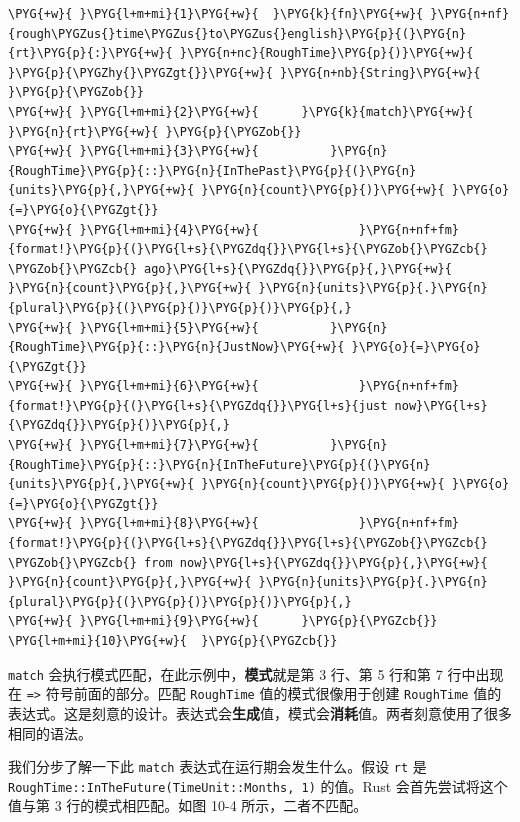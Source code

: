 \begin{Verbatim}[commandchars=\\\{\},breaklines=true,breakanywhere=true,fontsize=\codefont,xleftmargin=17bp]
\PYG{+w}{ }\PYG{l+m+mi}{1}\PYG{+w}{  }\PYG{k}{fn}\PYG{+w}{ }\PYG{n+nf}{rough\PYGZus{}time\PYGZus{}to\PYGZus{}english}\PYG{p}{(}\PYG{n}{rt}\PYG{p}{:}\PYG{+w}{ }\PYG{n+nc}{RoughTime}\PYG{p}{)}\PYG{+w}{ }\PYG{p}{\PYGZhy{}\PYGZgt{}}\PYG{+w}{ }\PYG{n+nb}{String}\PYG{+w}{ }\PYG{p}{\PYGZob{}}
\PYG{+w}{ }\PYG{l+m+mi}{2}\PYG{+w}{      }\PYG{k}{match}\PYG{+w}{ }\PYG{n}{rt}\PYG{+w}{ }\PYG{p}{\PYGZob{}}
\PYG{+w}{ }\PYG{l+m+mi}{3}\PYG{+w}{          }\PYG{n}{RoughTime}\PYG{p}{::}\PYG{n}{InThePast}\PYG{p}{(}\PYG{n}{units}\PYG{p}{,}\PYG{+w}{ }\PYG{n}{count}\PYG{p}{)}\PYG{+w}{ }\PYG{o}{=}\PYG{o}{\PYGZgt{}}
\PYG{+w}{ }\PYG{l+m+mi}{4}\PYG{+w}{              }\PYG{n+nf+fm}{format!}\PYG{p}{(}\PYG{l+s}{\PYGZdq{}}\PYG{l+s}{\PYGZob{}\PYGZcb{} \PYGZob{}\PYGZcb{} ago}\PYG{l+s}{\PYGZdq{}}\PYG{p}{,}\PYG{+w}{ }\PYG{n}{count}\PYG{p}{,}\PYG{+w}{ }\PYG{n}{units}\PYG{p}{.}\PYG{n}{plural}\PYG{p}{(}\PYG{p}{)}\PYG{p}{)}\PYG{p}{,}
\PYG{+w}{ }\PYG{l+m+mi}{5}\PYG{+w}{          }\PYG{n}{RoughTime}\PYG{p}{::}\PYG{n}{JustNow}\PYG{+w}{ }\PYG{o}{=}\PYG{o}{\PYGZgt{}}
\PYG{+w}{ }\PYG{l+m+mi}{6}\PYG{+w}{              }\PYG{n+nf+fm}{format!}\PYG{p}{(}\PYG{l+s}{\PYGZdq{}}\PYG{l+s}{just now}\PYG{l+s}{\PYGZdq{}}\PYG{p}{)}\PYG{p}{,}
\PYG{+w}{ }\PYG{l+m+mi}{7}\PYG{+w}{          }\PYG{n}{RoughTime}\PYG{p}{::}\PYG{n}{InTheFuture}\PYG{p}{(}\PYG{n}{units}\PYG{p}{,}\PYG{+w}{ }\PYG{n}{count}\PYG{p}{)}\PYG{+w}{ }\PYG{o}{=}\PYG{o}{\PYGZgt{}}
\PYG{+w}{ }\PYG{l+m+mi}{8}\PYG{+w}{              }\PYG{n+nf+fm}{format!}\PYG{p}{(}\PYG{l+s}{\PYGZdq{}}\PYG{l+s}{\PYGZob{}\PYGZcb{} \PYGZob{}\PYGZcb{} from now}\PYG{l+s}{\PYGZdq{}}\PYG{p}{,}\PYG{+w}{ }\PYG{n}{count}\PYG{p}{,}\PYG{+w}{ }\PYG{n}{units}\PYG{p}{.}\PYG{n}{plural}\PYG{p}{(}\PYG{p}{)}\PYG{p}{)}\PYG{p}{,}
\PYG{+w}{ }\PYG{l+m+mi}{9}\PYG{+w}{      }\PYG{p}{\PYGZcb{}}
\PYG{l+m+mi}{10}\PYG{+w}{  }\PYG{p}{\PYGZcb{}}
\end{Verbatim}

\texttt{match} 会执行模式匹配，在此示例中，\textbf{模式}就是第 3 行、第 5 行和第 7 行中出现在 \texttt{=>} 符号前面的部分。匹配 \texttt{RoughTime} 值的模式很像用于创建 \texttt{RoughTime} 值的表达式。这是刻意的设计。表达式会\textbf{生成}值，模式会\textbf{消耗}值。两者刻意使用了很多相同的语法。

我们分步了解一下此 \texttt{match} 表达式在运行期会发生什么。假设 \texttt{rt} 是 \texttt{RoughTime::InTheFuture(TimeUnit::Months, 1)} 的值。Rust 会首先尝试将这个值与第 3 行的模式相匹配。如图 10-4 所示，二者不匹配。

